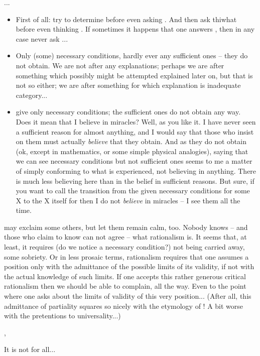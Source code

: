 {...
\begin{itemize}\MyLPar
\item
  First of all: try to determine  before even asking .
  And then ask thi{what} before even thinking . If sometimes it happens
  that one answers , then in any case never ask ...
\item
  Only (some) necessary conditions, hardly ever any sufficient ones -- they
  do not obtain. We are not after any explanations; perhaps we are after
  something which possibly might be attempted explained later on, but that is
  not so either; we are after something for which explanation is inadequate
  category...
\item
  give only necessary conditions; the sufficient ones do not obtain any
  way. Does it mean that I believe in miracles? Well, as you like it. I have
  never seen a sufficient reason for almost anything, and I would say that those
  who insist on them must actually {\em believe} that they obtain. And as they
  do not obtain (ok, except in mathematics, or some simple physical analogies),
  saying that we can see necessary conditions but not sufficient ones 
  seems to me a matter of simply conforming to what is experienced, not believing
  in anything. There is much less believing here than in the belief in
  sufficient reasons. But sure, if you want to call the transition from the
  given necessary 
  conditions for some X to the X itself for  then I
  do not {\em believe} in miracles -- I see them all the time.
\end{itemize}
 may exclaim some others, but let them remain calm, too.
Nobody knows -- and those who claim to know can not agree -- what rationalism
is. It seems that, at least, it requires (do we notice a necessary condition?)
not being carried away, some sobriety. Or in less prosaic terms, rationalism
requires that one assumes a position only with the admittance of the possible
limits of its validity, if not with the actual knowledge of such limits.  If one
accepts this rather generous critical rationalism then we should be able to
complain, all the way. Even to the point where one asks about the limits of
validity of this very position...  (After all, this admittance of partiality
squares so nicely with the etymology of ! A bit worse with the
pretentions to universality...)

\sep

It is not for all...

}
